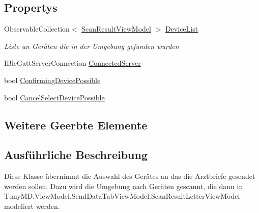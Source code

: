 \subsection*{Propertys}
\begin{DoxyCompactItemize}
\item 
Observable\+Collection$<$ \mbox{\hyperlink{classmy_m_d_1_1_view_model_1_1_send_data_tab_view_model_1_1_scan_result_view_model}{Scan\+Result\+View\+Model}} $>$ \mbox{\hyperlink{classmy_m_d_1_1_view_model_1_1_send_data_tab_view_model_1_1_select_device_view_model_a2c0271b0ca7d8b38d3297d023fcbb74d}{Device\+List}}
\begin{DoxyCompactList}\small\item\em Liste an Geräten die in der Umgebung gefunden wurden \end{DoxyCompactList}\item 
I\+Ble\+Gatt\+Server\+Connection \mbox{\hyperlink{classmy_m_d_1_1_view_model_1_1_send_data_tab_view_model_1_1_select_device_view_model_a52bb13e2b6ce00c547142eb91e4d3ee8}{Connected\+Server}}
\item 
bool \mbox{\hyperlink{classmy_m_d_1_1_view_model_1_1_send_data_tab_view_model_1_1_select_device_view_model_aa467f01d3cfb1aee4e7709bafa37aa5f}{Confirming\+Device\+Possible}}
\item 
bool \mbox{\hyperlink{classmy_m_d_1_1_view_model_1_1_send_data_tab_view_model_1_1_select_device_view_model_a29af90bec0cd2a1d3a62ccd3c5639727}{Cancel\+Select\+Device\+Possible}}
\end{DoxyCompactItemize}
\subsection*{Weitere Geerbte Elemente}


\subsection{Ausführliche Beschreibung}
Diese Klasse übernimmt die Auswahl des Gerätes an das die Arztbriefe gesendet werden sollen. Dazu wird die Umgebung nach Geräten gescannt, die dann in T\+:my\+M\+D.\+View\+Model.\+Send\+Data\+Tab\+View\+Model.\+Scan\+Result\+Letter\+View\+Model modeliert werden. 



